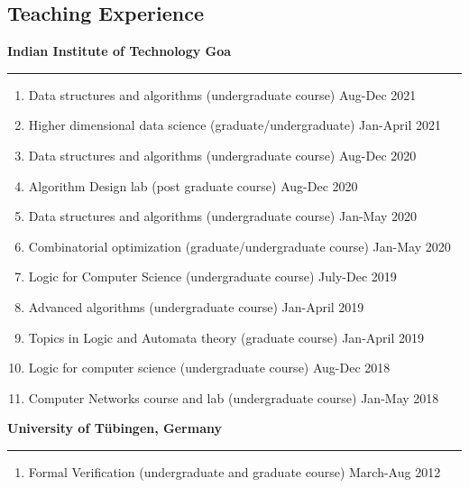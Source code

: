 \documentclass[margin]{res}
\begin{document}
\begin{resume}
\section{Teaching Experience}
					{\bf Indian Institute of Technology Goa } \\
					\noindent\rule{13cm}{0.4pt}
					\begin{enumerate}
					\item {Data structures and algorithms} (undergraduate course) \hfill Aug-Dec 2021
					\item {Higher dimensional data science} (graduate/undergraduate) \hfill Jan-April 2021
					\item {Data structures and algorithms} (undergraduate course)  \hfill  Aug-Dec 2020 
					\item {Algorithm Design lab} (post graduate course) \hfill  Aug-Dec 2020
					\item {Data structures and algorithms} (undergraduate course) \hfill  Jan-May 2020 			
					\item {Combinatorial optimization} (graduate/undergraduate course) \hfill  Jan-May 2020 
					
					\item {Logic for Computer Science}  (undergraduate course) \hfill  July-Dec 2019
					\item {Advanced algorithms} (undergraduate course) \hfill Jan-April 2019 					
					\item {Topics in Logic and Automata theory} (graduate course) \hfill Jan-April 2019
					\item {Logic for computer science} (undergraduate course) \hfill Aug-Dec 2018 
					\item {Computer Networks course and lab} (undergraduate course)  \hfill Jan-May 2018 
					\end{enumerate}
					
					{\bf University of T\"ubingen, Germany } \\
					\noindent\rule{13cm}{0.4pt}
					\begin{enumerate}
					\item {Formal Verification}  (undergraduate and graduate course) \hfill March-Aug 2012 
					\end{enumerate}
									


\end{resume}
\end{document}
